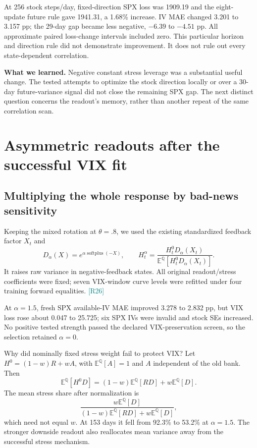 \documentclass[11pt,a4paper]{article}
\newcommand{\E}{\mathbb E^{\mathbb Q}}
\newcommand{\splus}{\operatorname{softplus}}
\newcommand{\src}[1]{\textcolor{teal}{\small[#1]}}
\newcommand{\lesson}[1]{\par\smallskip\noindent\colorbox{teal!9}{\parbox{\dimexpr\linewidth-2\fboxsep}{\textbf{What we learned.} #1}}\par\smallskip}
\begin{document}
At 256 stock steps/day, fixed-direction SPX loss was 1909.19 and the eight-update future rule gave 1941.31, a 1.68\% increase. IV MAE changed 3.201 to 3.157 pp; the 29-day gap became less negative, $-6.39$ to $-4.51$ pp. All approximate paired loss-change intervals included zero. This particular horizon and direction rule did not demonstrate improvement. It does not rule out every state-dependent correlation.

\lesson{Negative constant stress leverage was a substantial useful change. The tested attempts to optimize the stock direction locally or over a 30-day future-variance signal did not close the remaining SPX gap. The next distinct question concerns the readout's memory, rather than another repeat of the same correlation scan.}

\section{Asymmetric readouts after the successful VIX fit}
\subsection{Multiplying the whole response by bad-news sensitivity}
Keeping the mixed rotation at $\theta=.8$, we used the existing standardized feedback factor $X_t$ and
\begin{equation}
D_\alpha(X)=e^{\alpha\splus(-X)},\qquad
H_t^\alpha=\frac{H_t^0D_\alpha(X_t)}{\E[H_t^0D_\alpha(X_t)]}.
\end{equation}
It raises raw variance in negative-feedback states. All original readout/stress coefficients were fixed; seven VIX-window curve levels were refitted under four training forward equalities. \src{R26}

At $\alpha=1.5$, fresh SPX available-IV MAE improved 3.278 to 2.832 pp, but VIX loss rose about 0.047 to 25.725; six SPX IVs were invalid and stock SEs increased. No positive tested strength passed the declared VIX-preservation screen, so the selection retained $\alpha=0$.

Why did nominally fixed stress weight fail to protect VIX? Let $H^0=(1-w)R+wA$, with $\E[A]=1$ and $A$ independent of the old bank. Then
\begin{equation}
\E[H^0D]=(1-w)\E[RD]+w\E[D].
\end{equation}
The mean stress share after normalization is
\begin{equation}
\frac{w\E[D]}{(1-w)\E[RD]+w\E[D]},
\end{equation}
which need not equal $w$. At 153 days it fell from 92.3\% to 53.2\% at $\alpha=1.5$. The stronger downside readout also reallocates mean variance away from the successful stress mechanism.
\end{document}
